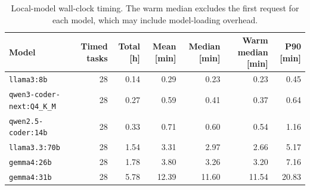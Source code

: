 \begin{table}[t]
\centering
\small
\caption{Local-model wall-clock timing. The warm median excludes the first
request for each model, which may include model-loading overhead.}
\label{tab:local-runtime-summary}
\begin{tabular}{lrrrrrr}
\toprule
Model & Timed tasks & Total [h] & Mean [min] & Median [min] &
Warm median [min] & P90 [min] \\
\midrule
\texttt{llama3:8b} & 28 & 0.14 & 0.29 & 0.23 & 0.23 & 0.45 \\
\texttt{qwen3-coder-next:Q4\_K\_M} & 28 & 0.27 & 0.59 & 0.41 & 0.37 & 0.64 \\
\texttt{qwen2.5-coder:14b} & 28 & 0.33 & 0.71 & 0.60 & 0.54 & 1.16 \\
\texttt{llama3.3:70b} & 28 & 1.54 & 3.31 & 2.97 & 2.66 & 5.17 \\
\texttt{gemma4:26b} & 28 & 1.78 & 3.80 & 3.26 & 3.20 & 7.16 \\
\texttt{gemma4:31b} & 28 & 5.78 & 12.39 & 11.60 & 11.54 & 20.83 \\
\bottomrule
\end{tabular}
\end{table}
